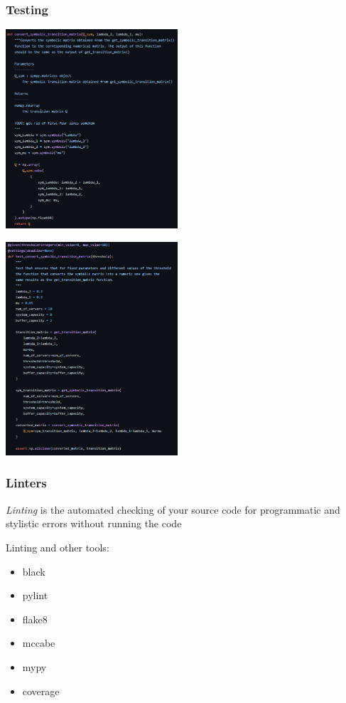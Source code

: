 \begin{frame}
    \frametitle{Testing}
    
    \begin{multicols}{2}
        \includegraphics[width=0.48\textwidth]{Bin/ambulance_game_code.PNG}

        \columnbreak

        \includegraphics[width=0.48\textwidth]{Bin/ambulance_game_test.PNG}
    \end{multicols}

\end{frame}


\begin{frame}
    \frametitle{Linters}
    \centering

    \textit{Linting} is the automated checking of your source code for 
    programmatic and stylistic errors without running the code
    
    \vspace{1cm}

    Linting and other tools:
    
    \begin{multicols}{3}
        \begin{itemize}
            \item black
            \item pylint
            \item flake8
            \item mccabe
            \item mypy
            \item coverage
        \end{itemize}
    \end{multicols}
\end{frame}



